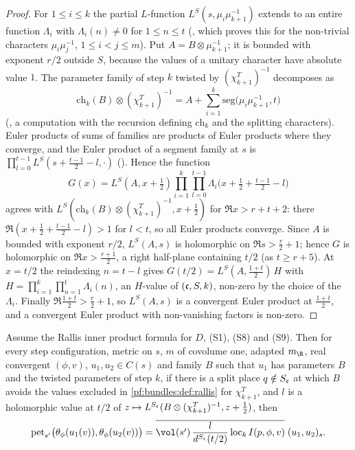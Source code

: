\begin{proof}
For $1\le i\le k$ the partial $L$-function $L^S(s,\mu_i\mu_{k+1}^{-1})$ extends to an entire function $\Lambda_i$ with $\Lambda_i(n)\ne0$ for
$1\le n\le t$ (, which proves this for the non-trivial
characters $\mu_i\mu_j^{-1}$, $1\le i<j\le m$). Put $A=B\otimes\mu_{k+1}^{-1}$; it is bounded with exponent $r/2$ outside $S$, because the
values of a unitary character have absolute value $1$. The parameter family of step $k$ twisted by $(\chi^T_{k+1})^{-1}$ decomposes as
\begin{equation}\label{pf:bundles:eq:chtwist}
\mathrm{ch}_k(B)\otimes(\chi^T_{k+1})^{-1}=A+\sum_{i=1}^k\mathrm{seg}\bigl(\mu_i\mu_{k+1}^{-1},t\bigr)
\end{equation}
(, a computation with the recursion defining
$\mathrm{ch}_k$ and the splitting characters). Euler products of sums of families are products of Euler products where they converge, and
the Euler product of a segment family at $s$ is $\prod_{l=0}^{t-1}L^S(s+\frac{t-1}2-l,\cdot)$
(). Hence the function
\[
G(x)=L^S(A,x+\tfrac12)\prod_{i=1}^k\prod_{l=0}^{t-1}\Lambda_i\bigl(x+\tfrac12+\tfrac{t-1}2-l\bigr)
\]
agrees with $L^S(\mathrm{ch}_k(B)\otimes(\chi^T_{k+1})^{-1},x+\frac12)$ for $\Re x>r+t+2$: there $\Re(x+\frac12+\frac{t-1}2-l)>1$ for $l<t$,
so all Euler products converge. Since $A$ is bounded with exponent $r/2$, $L^S(A,s)$ is holomorphic on $\Re s>\frac r2+1$; hence $G$ is
holomorphic on $\Re x>\frac{r+1}2$, a right half-plane containing $t/2$ (as $t\ge r+5$). At $x=t/2$ the reindexing $n=t-l$ gives
$G(t/2)=L^S(A,\frac{1+t}2)\,H$ with $H=\prod_{i=1}^k\prod_{n=1}^t\Lambda_i(n)$, an $H$-value of $(\mathfrak c,S,k)$, non-zero by the choice of the
$\Lambda_i$. Finally $\Re\frac{1+t}2>\frac r2+1$, so $L^S(A,s)$ is a convergent Euler product at $\frac{1+t}2$, and a convergent Euler product
with non-vanishing factors is non-zero.
\end{proof}

\begin{lemma}\label{pf:bundles:lem:exact}
Assume the Rallis inner product formula for $D$, (S1), (S8) and (S9). Then for every step configuration, metric on $s$, $m$ of covolume one,
adapted $m_\R$, real convergent $(\phi,v)$, $u_1,u_2\in C(s)$ and family $B$ such that $u_1$ has parameters $B$ and the twisted parameters of
step $k$, if there is a split place $q\notin S_\mathfrak c$ at which $B$ avoids the values excluded in \cref{pf:bundles:def:rallis} for
$\chi^T_{k+1}$, and $l$ is a holomorphic value at $t/2$ of $z\mapsto L^{S_\mathfrak c}(B\otimes(\chi^T_{k+1})^{-1},z+\frac12)$, then
\begin{equation}\label{pf:bundles:eq:exact}
\mathrm{pet}_{s'}\bigl(\theta_\phi(u_1(v)),\theta_\phi(u_2(v))\bigr)=\overline{\vol(s')\,\frac{l}{d^{S_\bundc}(t/2)}\,\mathrm{loc}_k\,
I(p,\phi,v)}\;(u_1,u_2)_s .
\end{equation}
\end{lemma}

